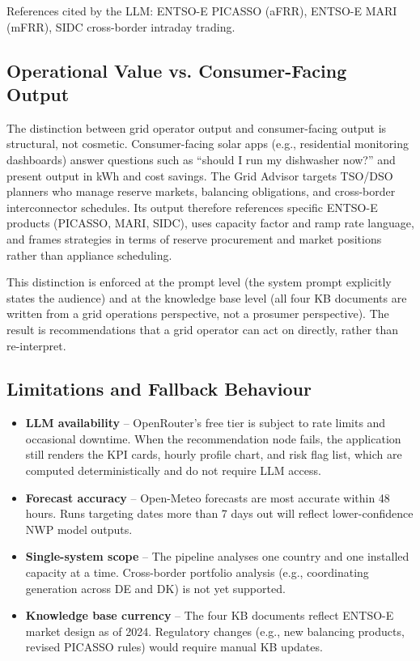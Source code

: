 \documentclass[12pt, a4paper]{article}
\begin{document}
References cited by the LLM: ENTSO-E PICASSO (aFRR), ENTSO-E MARI (mFRR), SIDC cross-border intraday trading.

\subsection{Operational Value vs. Consumer-Facing Output}

The distinction between grid operator output and consumer-facing output is structural, not cosmetic. Consumer-facing solar apps (e.g., residential monitoring dashboards) answer questions such as ``should I run my dishwasher now?'' and present output in kWh and cost savings. The Grid Advisor targets TSO/DSO planners who manage reserve markets, balancing obligations, and cross-border interconnector schedules. Its output therefore references specific ENTSO-E products (PICASSO, MARI, SIDC), uses capacity factor and ramp rate language, and frames strategies in terms of reserve procurement and market positions rather than appliance scheduling.

This distinction is enforced at the prompt level (the system prompt explicitly states the audience) and at the knowledge base level (all four KB documents are written from a grid operations perspective, not a prosumer perspective). The result is recommendations that a grid operator can act on directly, rather than re-interpret.

\clearpage
\subsection{Limitations and Fallback Behaviour}

\begin{itemize}[noitemsep]
    \item \textbf{LLM availability} -- OpenRouter's free tier is subject to rate limits and occasional downtime. When the recommendation node fails, the application still renders the KPI cards, hourly profile chart, and risk flag list, which are computed deterministically and do not require LLM access.
    \item \textbf{Forecast accuracy} -- Open-Meteo forecasts are most accurate within 48 hours. Runs targeting dates more than 7 days out will reflect lower-confidence NWP model outputs.
    \item \textbf{Single-system scope} -- The pipeline analyses one country and one installed capacity at a time. Cross-border portfolio analysis (e.g., coordinating generation across DE and DK) is not yet supported.
    \item \textbf{Knowledge base currency} -- The four KB documents reflect ENTSO-E market design as of 2024. Regulatory changes (e.g., new balancing products, revised PICASSO rules) would require manual KB updates.
\end{itemize}
\end{document}
